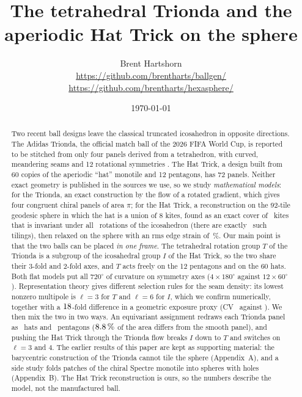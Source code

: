 \documentclass[11pt]{article}
\title{The tetrahedral Trionda and the aperiodic Hat Trick on the sphere}
\author{Brent Hartshorn \orcidlink{0009-0004-2853-655X} \\
\footnotesize
\url{https://github.com/brentharts/ballgen/}
\\
\footnotesize
\url{https://github.com/brentharts/hexasphere/}
}
\date{\today}
\theoremstyle{definition}
\theoremstyle{remark}
\begin{document}
\maketitle

\begin{abstract}
Two recent ball designs leave the classical truncated icosahedron in opposite directions. The Adidas Trionda, the official match ball
of the 2026 FIFA World Cup, is reported to be stitched from only four panels derived from a tetrahedron, with curved, meandering seams and
12 rotational symmetries \citep{hasson_sciam,wiki_trionda}. The Hat Trick, a design built from 60 copies of the aperiodic ``hat'' monotile
\citep{smith_hat} and 12 pentagons, has 72 panels. Neither exact geometry is published in the sources we use, so we study \emph{mathematical models}:
for the Trionda, an exact construction by the flow of a rotated gradient, which gives four congruent chiral panels of area $\pi$; for the Hat Trick,
a reconstruction on the 92-tile geodesic sphere in which the hat is a union of $8$ kites, found as an exact cover of \htKites\ kites that is invariant
under all \htRotations\ rotations of the icosahedron (there are exactly \htTilings\ such tilings), then relaxed on the sphere with an rms edge strain of \htRms\,\%.
Our main point is that the two balls can be placed \emph{in one frame}. The tetrahedral rotation group $T$ of the Trionda is a subgroup of the icosahedral group $I$ of the Hat Trick,
so the two share their 3-fold and 2-fold axes, and $T$ acts freely on the 12 pentagons and on the 60 hats. Both flat models put all $720^\circ$ of curvature on symmetry axes
($4\times180^\circ$ against $12\times60^\circ$). Representation theory gives different selection rules for the seam density: its lowest nonzero multipole is $\ell=3$ for $T$ and $\ell=6$ for $I$, which we
confirm numerically, together with a $18$-fold difference in a geometric exposure proxy (CV \cmpTriCV\ against \cmpHatCV). We then mix the two in two ways. An equivariant assignment redraws each Trionda panel
as \blHats\ hats and \blPent\ pentagons ($8.8\,\%$ of the area differs from the smooth panel), and pushing the Hat Trick through the Trionda flow breaks $I$ down to $T$ and switches on $\ell=3$ and $4$.
The earlier results of this paper are kept as supporting material: the barycentric construction of the Trionda cannot tile the sphere (Appendix~A), and a side study folds patches of the chiral Spectre monotile into spheres with holes (Appendix~B).
The Hat Trick reconstruction is ours, so the numbers describe the model, not the manufactured ball.
\end{abstract}
\end{document}
